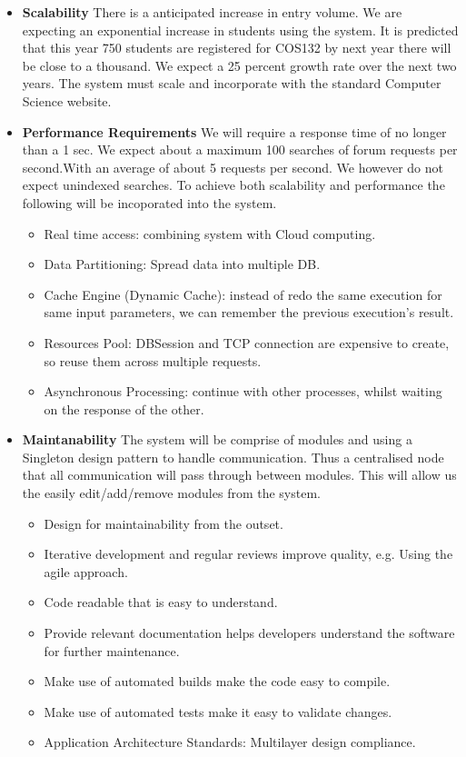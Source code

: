 
%

\begin{itemize}
	\item \textbf{Scalability}
		There is a anticipated increase in entry volume. We are expecting an exponential increase in students using the system. It is predicted that this year 750 students are registered for COS132 by next year there will be close to a thousand. We expect a 25 percent growth rate over the next two years. 			\cite{classRepMeeting}
		The system must scale and incorporate with the standard Computer Science website. 
	\item \textbf{Performance Requirements}
		We will require a response time of no longer than a 1 sec. We expect about a maximum 100 searches of forum requests per second.With an average of about 5 requests per second. We however do not expect unindexed searches. To achieve both scalability and performance the following will be incoporated into the system.
		\begin{itemize}
			\item Real time access: combining system with Cloud computing.
			\item Data Partitioning: Spread data into multiple DB.
			\item Cache Engine (Dynamic Cache): instead of redo the same execution for same input parameters, we can remember the previous execution's result.
			\item Resources Pool: DBSession and TCP connection are expensive to create, so reuse them across multiple requests.
			\item Asynchronous Processing: continue with other processes, whilst waiting on the response of the other.
		\end{itemize}
	\item \textbf{Maintanability}
		The system will be comprise of modules and using a Singleton design pattern to handle communication. Thus a centralised node that all communication will pass through between modules. This will allow us the easily edit/add/remove modules from the system.
		\begin{itemize}
			\item Design for maintainability from the outset.
			\item Iterative development and regular reviews improve quality, e.g. Using the agile approach.
			\item Code readable that is easy to understand.
			\item Provide relevant documentation helps developers understand the software for further maintenance.
			\item Make use of automated builds make the code easy to compile.
			\item Make use of automated tests make it easy to validate changes.
			\item Application Architecture Standards: Multilayer design compliance.
			

\end{itemize}
\end{itemize}
